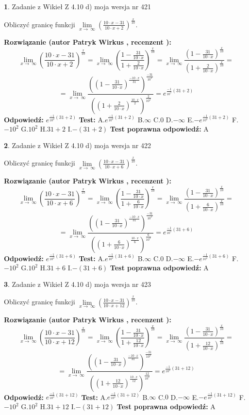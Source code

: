 \documentclass[12pt, a4paper]{article}
\theoremstyle{definition} %
\newtheorem{zad}{}
\newcommand{\zadStart}[1]{\begin{zad}#1\newline}
\newcommand{\zadStop}{\end{zad}}
\newcommand{\rozwStart}[2]{\noindent \textbf{Rozwiązanie (autor #1 , recenzent #2): }\newline}
\newcommand{\rozwStop}{\newline}
\newcommand{\odpStart}{\noindent \textbf{Odpowiedź:}\newline}
\newcommand{\odpStop}{\newline}
\newcommand{\testStart}{\noindent \textbf{Test:}\newline}
\newcommand{\testStop}{\newline}
\newcommand{\kluczStart}{\noindent \textbf{Test poprawna odpowiedź:}\newline}
\newcommand{\kluczStop}{\newline}
\begin{document}
\zadStart{Zadanie z Wikieł Z 4.10 d) moja wersja nr 421}


Obliczyć granicę funkcji  $\lim\limits_{x\to\ \infty}(\frac{10\cdot x-31}{10\cdot x+2})^{\frac{x}{10}}$.
\zadStop
\rozwStart{Patryk Wirkus}{}
$$\lim\limits_{x\to\ \infty}(\frac{10\cdot x-31}{10\cdot x+2})^{\frac{x}{10}} = \lim\limits_{x\to\ \infty}(\frac{1-\frac{31}{10\cdot x}}{1+\frac{2}{10\cdot x}})^{\frac{x}{10}}=\lim\limits_{x\to\ \infty}\frac{(1-\frac{31}{10\cdot x})^{\frac{x}{10}}}{(1+\frac{2}{10\cdot x})^{\frac{x}{10}}}=$$
$$=\lim\limits_{x\to\ \infty}\frac{((1-\frac{31}{10\cdot x})^{\frac{-10\cdot x}{31}})^{\frac{-31}{10^{2}}}}{((1+\frac{2}{10\cdot x})^{\frac{10\cdot x}{2}})^{\frac{2}{10^{2}}}}=e^{\frac{-1}{10^{2}}(31+2)}$$
\rozwStop
\odpStart
$e^{\frac{-1}{10^{2}}(31+2)}$
\odpStop
\testStart
A.$e^{\frac{-1}{10^{2}}(31+2)}$ B.$\infty$ C.$0$ D.$-\infty$ E.$-e^{\frac{-1}{10^{2}}(31+2)}$
F.$-10^{2}$ G.$10^{2}$
H.$31+2$
I.$-(31+2)$
\testStop
\kluczStart
A
\kluczStop



\zadStart{Zadanie z Wikieł Z 4.10 d) moja wersja nr 422}


Obliczyć granicę funkcji  $\lim\limits_{x\to\ \infty}(\frac{10\cdot x-31}{10\cdot x+6})^{\frac{x}{10}}$.
\zadStop
\rozwStart{Patryk Wirkus}{}
$$\lim\limits_{x\to\ \infty}(\frac{10\cdot x-31}{10\cdot x+6})^{\frac{x}{10}} = \lim\limits_{x\to\ \infty}(\frac{1-\frac{31}{10\cdot x}}{1+\frac{6}{10\cdot x}})^{\frac{x}{10}}=\lim\limits_{x\to\ \infty}\frac{(1-\frac{31}{10\cdot x})^{\frac{x}{10}}}{(1+\frac{6}{10\cdot x})^{\frac{x}{10}}}=$$
$$=\lim\limits_{x\to\ \infty}\frac{((1-\frac{31}{10\cdot x})^{\frac{-10\cdot x}{31}})^{\frac{-31}{10^{2}}}}{((1+\frac{6}{10\cdot x})^{\frac{10\cdot x}{6}})^{\frac{6}{10^{2}}}}=e^{\frac{-1}{10^{2}}(31+6)}$$
\rozwStop
\odpStart
$e^{\frac{-1}{10^{2}}(31+6)}$
\odpStop
\testStart
A.$e^{\frac{-1}{10^{2}}(31+6)}$ B.$\infty$ C.$0$ D.$-\infty$ E.$-e^{\frac{-1}{10^{2}}(31+6)}$
F.$-10^{2}$ G.$10^{2}$
H.$31+6$
I.$-(31+6)$
\testStop
\kluczStart
A
\kluczStop



\zadStart{Zadanie z Wikieł Z 4.10 d) moja wersja nr 423}


Obliczyć granicę funkcji  $\lim\limits_{x\to\ \infty}(\frac{10\cdot x-31}{10\cdot x+12})^{\frac{x}{10}}$.
\zadStop
\rozwStart{Patryk Wirkus}{}
$$\lim\limits_{x\to\ \infty}(\frac{10\cdot x-31}{10\cdot x+12})^{\frac{x}{10}} = \lim\limits_{x\to\ \infty}(\frac{1-\frac{31}{10\cdot x}}{1+\frac{12}{10\cdot x}})^{\frac{x}{10}}=\lim\limits_{x\to\ \infty}\frac{(1-\frac{31}{10\cdot x})^{\frac{x}{10}}}{(1+\frac{12}{10\cdot x})^{\frac{x}{10}}}=$$
$$=\lim\limits_{x\to\ \infty}\frac{((1-\frac{31}{10\cdot x})^{\frac{-10\cdot x}{31}})^{\frac{-31}{10^{2}}}}{((1+\frac{12}{10\cdot x})^{\frac{10\cdot x}{12}})^{\frac{12}{10^{2}}}}=e^{\frac{-1}{10^{2}}(31+12)}$$
\rozwStop
\odpStart
$e^{\frac{-1}{10^{2}}(31+12)}$
\odpStop
\testStart
A.$e^{\frac{-1}{10^{2}}(31+12)}$ B.$\infty$ C.$0$ D.$-\infty$ E.$-e^{\frac{-1}{10^{2}}(31+12)}$
F.$-10^{2}$ G.$10^{2}$
H.$31+12$
I.$-(31+12)$
\testStop
\kluczStart
A
\kluczStop
\end{document}

